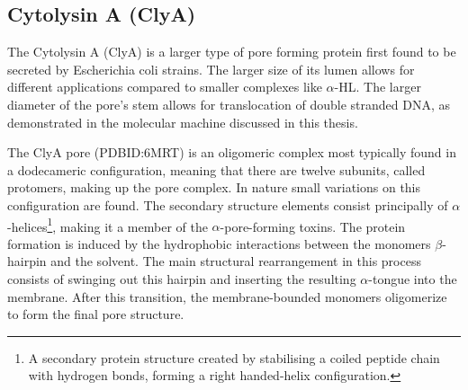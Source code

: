 \begin{figure}[ht!]
\begin{centering}
\begin{subfigure}[t]{\dimexpr.3\linewidth-1.3em\relax}
  \end{subfigure}%

  \caption[Structural overview of the Cytolysin A (ClyA) pore forming
  protein.]{}
  \label{fig:ClyA}

  \end{centering}
\end{figure}

\subsection{Cytolysin A (ClyA)}

The Cytolysin A (ClyA) is a larger type of pore forming protein first found to be
secreted by Escherichia coli strains. \cite{Mueller2009} The larger size of its lumen
allows for
different applications compared to smaller complexes like $\alpha$-HL. The
larger diameter of the pore's stem allows for translocation of double stranded DNA, as
demonstrated in the molecular machine discussed in this thesis.

The ClyA pore (PDBID:6MRT\cite{Peng2019}) is an oligomeric complex most typically found
in a dodecameric configuration,  meaning that there are twelve subunits, called
protomers, making up the pore complex. In nature small variations on this configuration
are found.
The secondary structure elements consist principally of
$\alpha$-helices\footnote{A secondary protein structure created by stabilising a coiled
peptide chain with hydrogen bonds, forming a right handed-helix configuration.},
making it a member of the $ \alpha$-pore-forming toxins. The protein formation is induced
by the hydrophobic interactions between the monomers $\beta$-hairpin and the solvent. The
main structural rearrangement in this process consists of swinging out this hairpin and
inserting the resulting $\alpha$-tongue into the membrane. After this transition, the
membrane-bounded monomers oligomerize to form the final pore structure.\cite{Benke2015}

